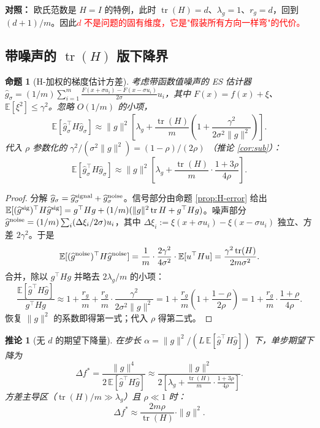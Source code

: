 \documentclass[UTF8]{ctexart}
\newtheorem{proposition}{命题}
\newtheorem{corollary}{推论}
\begin{document}
\textbf{对照：} 欧氏范数是 $H=I$ 的特例，此时 $\operatorname{tr}(H)=d$、$\lambda_g=1$、$r_g=d$，回到 $(d+1)/m$。因此\textcolor{red}{$d$ 不是问题的固有维度，它是"假装所有方向一样弯"的代价。}

\subsection{带噪声的 $\operatorname{tr}(H)$ 版下降界}

\begin{proposition}[H-加权的梯度估计方差]
\label{prop:H-total}
考虑带函数值噪声的 ES 估计器 $\widehat g_\sigma = (1/m)\sum_{i=1}^m \frac{F(x+\sigma u_i)-F(x-\sigma u_i)}{2\sigma}u_i$，其中 $F(x)=f(x)+\xi$、$\mathbb E[\xi^2]\leq\gamma^2$。忽略 $O(1/m)$ 的小项，
\[
\boxed{
\mathbb E[\widehat g_\sigma^\top H \widehat g_\sigma]
\approx
\|g\|^2\left[\lambda_g + \frac{\operatorname{tr}(H)}{m}\left(1 + \frac{\gamma^2}{2\sigma^2\|g\|^2}\right)\right].
}
\]
代入 $\rho$ 参数化的 $\gamma^2/(\sigma^2\|g\|^2) = (1-\rho)/(2\rho)$ （推论 \ref{cor:sub}）：
\[
\boxed{
\mathbb E[\widehat g_\sigma^\top H \widehat g_\sigma]
\approx
\|g\|^2\left[\lambda_g + \frac{\operatorname{tr}(H)}{m}\cdot\frac{1+3\rho}{4\rho}\right].
}
\]
\end{proposition}

\begin{proof}
分解 $\widehat g_\sigma = \widehat g_\sigma^{\rm signal} + \widehat g_\sigma^{\rm noise}$。信号部分由命题 \ref{prop:H-error} 给出 $\mathbb E[(\widehat g^{\rm sig})^\top H \widehat g^{\rm sig}] = g^\top H g + (1/m)(\|g\|^2\operatorname{tr} H + g^\top H g)$。噪声部分 $\widehat g^{\rm noise} = (1/m)\sum_i (\Delta\xi_i/2\sigma)u_i$，其中 $\Delta\xi_i := \xi(x+\sigma u_i)-\xi(x-\sigma u_i)$ 独立、方差 $2\gamma^2$。于是
\[
\mathbb E[(\widehat g^{\rm noise})^\top H \widehat g^{\rm noise}]
=
\frac{1}{m}\cdot\frac{2\gamma^2}{4\sigma^2}\cdot\mathbb E[u^\top H u]
=
\frac{\gamma^2\operatorname{tr}(H)}{2m\sigma^2}.
\]
合并，除以 $g^\top H g$ 并略去 $2\lambda_g/m$ 的小项：
\[
\frac{\mathbb E[\widehat g^\top H\widehat g]}{g^\top H g}
\approx
1 + \frac{r_g}{m} + \frac{r_g}{m}\cdot\frac{\gamma^2}{2\sigma^2\|g\|^2}
=
1 + \frac{r_g}{m}\left(1+\frac{1-\rho}{2\rho}\right)
=
1 + \frac{r_g}{m}\cdot\frac{1+\rho}{4\rho}.
\]
恢复 $\|g\|^2$ 的系数即得第一式；代入 $\rho$ 得第二式。
\end{proof}

\begin{corollary}[无 $d$ 的期望下降量]
\label{cor:H-progress}
在步长 $\alpha = \|g\|^2 / (L\,\mathbb E[\widehat g^\top H\widehat g])$ 下，单步期望下降为
\[
\boxed{
\Delta f^*
=
\frac{\|g\|^4}{2\,\mathbb E[\widehat g^\top H\widehat g]}
\approx
\frac{\|g\|^2}{2\left[\lambda_g + \frac{\operatorname{tr}(H)}{m}\cdot\frac{1+3\rho}{4\rho}\right]}.
}
\]
方差主导区（$\operatorname{tr}(H)/m \gg \lambda_g$）且 $\rho\ll 1$ 时：
\[
\boxed{
\Delta f^* \approx \frac{2m\rho}{\operatorname{tr}(H)}\cdot\|g\|^2.
}
\]
\end{corollary}
\end{document}
